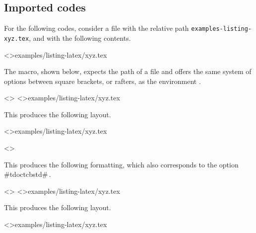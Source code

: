 \documentclass{tutodoc}
\begin{document}
\subsection{Imported codes}

For the following codes, consider a file with the relative path \verb+examples-listing-xyz.tex+, and with the following contents.

\tdoclatexinput<>{examples/listing-latex/xyz.tex}

\medskip

The  macro, shown below, expects the path of a file and offers the same system of options between square brackets, or rafters, as the environment .




\begin{tdocexa}
    \leavevmode

    \begin{tdoclatex}<>
\tdoclatexinput<>{examples/listing-latex/xyz.tex}
    \end{tdoclatex}

    This produces the following layout.

    \tdoclatexinput<>{examples/listing-latex/xyz.tex}
\end{tdocexa}




\begin{tdocexa}[Following]
    \leavevmode

    \begin{tdoclatex}<>
    \end{tdoclatex}

    This produces the following formatting, which also corresponds to the option \tdoclatexin#tdoctcb{std}#\,.

\end{tdocexa}




\begin{tdocexa}
    \leavevmode

    \begin{tdoclatex}<>
\tdoclatexinput<>{examples/listing-latex/xyz.tex}
    \end{tdoclatex}

    This produces the following layout.

    \tdoclatexinput<>{examples/listing-latex/xyz.tex}
\end{tdocexa}
\end{document}
